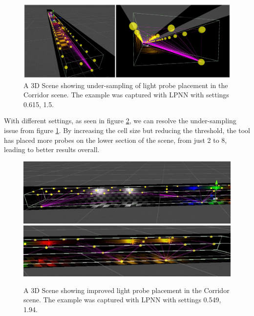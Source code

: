 \begin{figure}[h]
	\centering
	\includegraphics[scale=0.207]{Graphics/results/concats/comparison3.png}
	\caption{A 3D Scene showing under-sampling of light probe placement in the Corridor scene. The example was captured with LPNN with settings 0.615, 1.5.}
	\label{fig:comp3}
\end{figure}

With different settings, as seen in figure \ref{fig:comp4}, we can resolve the under-sampling issue from figure \ref{fig:comp3}. By increasing the cell size but reducing the threshold, the tool has placed more probes on the lower section of the scene, from just 2 to 8, leading to better results overall.

\begin{figure}[h]
	\centering
	\includegraphics[scale=0.32]{Graphics/results/corridor_0.549_1.94_E2.jpg}
	\includegraphics[scale=0.4623]{Graphics/results/corridor_0.549_1.94_E3.jpg}
	\caption{A 3D Scene showing improved light probe placement in the Corridor scene. The example was captured with LPNN with settings 0.549, 1.94.}
	\label{fig:comp4}
\end{figure}



